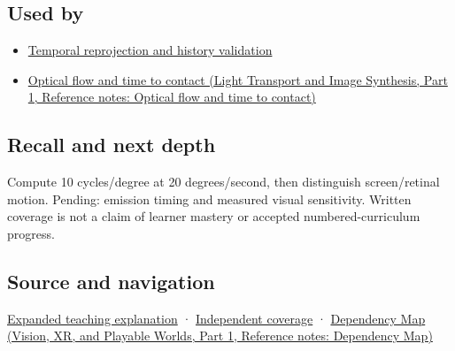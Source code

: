 \subsection{Used by}\label{appendix-70895739febb-used-by}

\hypertarget{appendix-70895739febb-used-by}{}

\begin{itemize}
\tightlist
\item
  \hyperref[appendix-0727340a4428]{Temporal reprojection and history validation}
\item
  \href{../04-Light-Transport-and-Image-Synthesis-P01/main.pdf\#nameddest=appendix-e2e73f8cd93e}{Optical flow and time to contact (Light Transport and Image Synthesis, Part 1, Reference notes: Optical flow and time to contact)}
\end{itemize}

\subsection{Recall and next depth}\label{appendix-70895739febb-recall-and-next-depth}

\hypertarget{appendix-70895739febb-recall-and-next-depth}{}

Compute 10 cycles/degree at 20 degrees/second, then distinguish screen/retinal motion. Pending: emission timing and measured visual sensitivity. Written coverage is not a claim of learner mastery or accepted numbered-curriculum progress.

\subsection{Source and navigation}\label{appendix-70895739febb-source-and-navigation}

\hypertarget{appendix-70895739febb-source-and-navigation}{}

\hyperref[04-visual-computing-ii-ch042-a-gaze-sample-needs-a-time-as-well-as-a-direction]{Expanded teaching explanation} · \hyperref[appendix-fd090d982a15-xr01---independent-seeing-and-representation-source]{Independent coverage} · \href{../07-Vision-XR-and-Playable-Worlds-P01/main.pdf\#nameddest=appendix-4ad47bdd269a}{Dependency Map (Vision, XR, and Playable Worlds, Part 1, Reference notes: Dependency Map)}
